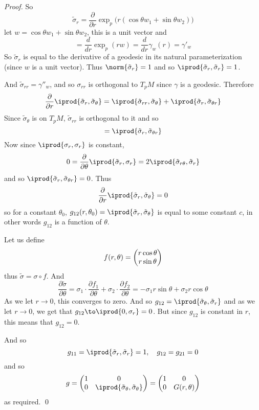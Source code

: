 \begin{proof}

    So
    \[ \tilde\sigma_r = \frac\partial{\partial r}\exp_p\bigl(r(\cos\theta w_1+\sin\theta w_2)\bigr) \]
    let $w=\cos\theta w_1+\sin\theta w_2$, this is a unit vector and
    \[ = \frac d{dr}\exp_p(rw) = \frac d{dr}\gamma_w(r) = \gamma'_w \]
    So $\tilde\sigma_r$ is equal to the derivative of a geodesic in its natural parameterization (since $w$ is a unit vector).
    Thus $\norm{\tilde\sigma_r}=1$ and so $\iprod{\tilde\sigma_r,\tilde\sigma_r}=1$.

    And $\tilde\sigma_{rr}=\gamma''_w$, and so $\sigma_{rr}$ is orthogonal to $T_pM$ since $\gamma$ is a geodesic.
    Therefore
    \[ \frac\partial{\partial r}\iprod{\tilde\sigma_r,\tilde\sigma_\theta} = \iprod{\tilde\sigma_{rr},\tilde\sigma_\theta} + \iprod{\tilde\sigma_r,\tilde\sigma_{\theta r}} \]
    Since $\tilde\sigma_\theta$ is on $T_pM$, $\tilde\sigma_{rr}$ is orthogonal to it and so
    \[ = \iprod{\tilde\sigma_r,\tilde\sigma_{\theta r}} \]
    Now since $\iprod{\sigma_r,\sigma_r}$ is constant,
    \[ 0 = \frac\partial{\partial\theta}\iprod{\tilde\sigma_r,\sigma_r} = 2\iprod{\tilde\sigma_{r\theta},\tilde\sigma_r} \]
    and so $\iprod{\tilde\sigma_r,\tilde\sigma_{\theta r}}=0$.
    Thus
    \[ \frac\partial{\partial r}\iprod{\tilde\sigma_r,\tilde\sigma_\theta} = 0 \]
    so for a constant $\theta_0$, $g_{12}(r,\theta_0)=\iprod{\tilde\sigma_r,\tilde\sigma_\theta}$ is equal to some constant $c$, in other words $g_{12}$ is a function of $\theta$.

    Let us define
    \[ f(r,\theta) = \begin{pmatrix}r\cos\theta \\ r\sin\theta\end{pmatrix} \]
    thus $\tilde\sigma=\sigma\circ f$.
    And
    \[ \frac{\partial\tilde\sigma}{\partial\theta} = \sigma_1\cdot\frac{\partial f_1}{\partial\theta} + \sigma_2\cdot\frac{\partial f_2}{\partial\theta} = -\sigma_1 r\sin\theta + \sigma_2 r\cos\theta \]
    As we let $r\to0$, this converges to zero.
    And so $g_{12}=\iprod{\tilde\sigma_\theta,\tilde\sigma_r}$ and as we let $r\to0$, we get that $g_{12}\to\iprod{0,\sigma_r}=0$.
    But since $g_{12}$ is constant in $r$, this means that $g_{12}=0$.

    And so
    \[ g_{11} = \iprod{\tilde\sigma_r,\tilde\sigma_r} = 1,\quad g_{12} = g_{21} = 0 \]
    and so
    \[ g = \pmat{1 & 0 \\ 0 & \iprod{\tilde\sigma_\theta,\tilde\sigma_\theta}} = \pmat{1 & 0 \\ 0 & G(r,\theta)} \]
    as required.
    \qed

\end{proof}

